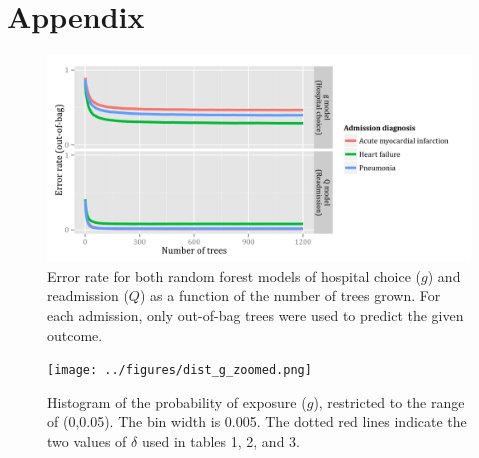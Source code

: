 \documentclass[]{article}\usepackage[]{graphicx}\usepackage[]{color}
\begin{document}
\printbibliography

\section{Appendix}
\begin{figure}[H]
    \includegraphics{../figures/error_rate_g_and_Q.png}
    \caption[Error rate for random forest model of hospital choice.]
      {Error rate for both random forest models of hospital choice ($g$) and readmission ($Q$) as a function of the number of trees grown. For each admission, only out-of-bag trees were used to predict the given outcome.}
    \label{fig:error_rate_for_g_and_Q}
\end{figure}


\begin{figure}[H]
    \texttt{[image: ../figures/dist\_g\_zoomed.png]}
    \caption[Histogram of the probability of exposure ($g$), restricted to the range of (0,0.05). The bin width is 0.005. The dotted red lines indicate the two values of $\delta$ used in tables 1, 2, and 3.]
      {Histogram of the probability of exposure ($g$), restricted to the range of (0,0.05). The bin width is 0.005. The dotted red lines indicate the two values of $\delta$ used in tables 1, 2, and 3.}
    \label{fig:dist_g_zoomed}
\end{figure}
\end{document}
